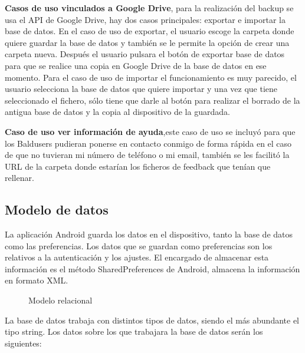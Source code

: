 \textbf{Casos de uso vinculados a Google Drive}, para la realización del backup se usa el API de Google Drive, hay dos casos principales: exportar e importar la base de datos.
En el caso de uso de exportar, el usuario escoge la carpeta donde quiere guardar la base de datos y también se le permite la opción de crear una carpeta nueva.
Después el usuario pulsara el botón de exportar base de datos para que se realice una copia en Google Drive de la base de datos en ese momento.
Para el caso de uso de importar el funcionamiento es muy parecido, el usuario selecciona la base de datos que quiere importar y una vez que tiene seleccionado el fichero, sólo tiene que darle al botón para realizar el borrado de la antigua base de datos y la copia al dispositivo de la guardada.

\textbf{Caso de uso ver información de ayuda},este caso de uso se incluyó para que los Baldusers pudieran ponerse en contacto conmigo de forma rápida en el caso de que no tuvieran mi número de teléfono o mi email, también se les facilitó la URL de la carpeta donde estarían los ficheros de feedback que tenían que rellenar.

\subsection{Modelo de datos}
\label{subsecc:modelo de datos}

La aplicación Android guarda los datos en el dispositivo, tanto la base de datos como las preferencias.
Los datos que se guardan como preferencias son los relativos a la autenticación y los ajustes. El encargado de almacenar esta información es el método SharedPreferences de Android, almacena la información en formato XML.


\begin{figure}[H]
  \begin{center} 
    \caption{Modelo relacional} 
    \label{fig:ModeloRelacional} 
  \end{center} 
\end{figure}
La base de datos trabaja con distintos tipos de datos, siendo el más abundante el tipo string.
Los datos sobre los que trabajara la base de datos serán los siguientes:

